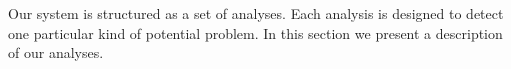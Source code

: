 \label{sec:analysis}
\smvertspace
Our system is structured as a set of analyses. Each analysis is designed to
detect one particular kind of potential problem. In this section we present a
description of our analyses.







